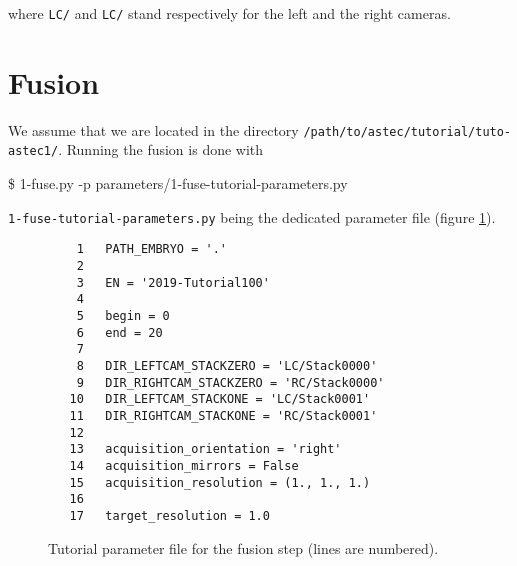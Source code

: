 where \texttt{LC/} and \texttt{LC/} stand respectively for the left
and the right cameras.





\section{Fusion}
\label{sec:tutorial:fusion}

We assume that we are located in the directory
\texttt{/path/to/astec/tutorial/tuto-astec1/}. Running the fusion is
done with
\begin{code}{0.8}
  \$ 1-fuse.py -p parameters/1-fuse-tutorial-parameters.py
\end{code}
\texttt{1-fuse-tutorial-parameters.py} being the dedicated parameter file  (figure \ref{fig:tutorial:parameter:fusion}).

\begin{figure}
\begin{framed}
\begin{verbatim}
    1	PATH_EMBRYO = '.'
    2	
    3	EN = '2019-Tutorial100'
    4	
    5	begin = 0
    6	end = 20
    7	
    8	DIR_LEFTCAM_STACKZERO = 'LC/Stack0000'
    9	DIR_RIGHTCAM_STACKZERO = 'RC/Stack0000'
   10	DIR_LEFTCAM_STACKONE = 'LC/Stack0001'
   11	DIR_RIGHTCAM_STACKONE = 'RC/Stack0001'
   12	
   13	acquisition_orientation = 'right'
   14	acquisition_mirrors = False
   15	acquisition_resolution = (1., 1., 1.)
   16	
   17	target_resolution = 1.0
\end{verbatim}
\end{framed}
\caption{\label{fig:tutorial:parameter:fusion} Tutorial parameter file
  for the fusion step (lines are numbered).}
\end{figure}

